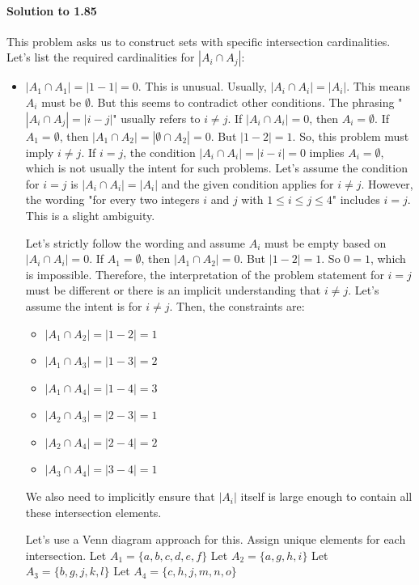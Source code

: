 \documentclass{article}
\begin{document}
\paragraph*{Solution to 1.85}
This problem asks us to construct sets with specific intersection cardinalities.
Let's list the required cardinalities for $|A_i \cap A_j|$:
\begin{itemize}
    \item $|A_1 \cap A_1| = |1-1| = 0$. This is unusual. Usually, $|A_i \cap A_i| = |A_i|$. This means $A_i$ must be $\emptyset$. But this seems to contradict other conditions.
    The phrasing "$|A_i \cap A_j| = |i-j|$" usually refers to $i \ne j$.
    If $|A_i \cap A_i| = 0$, then $A_i = \emptyset$. If $A_1 = \emptyset$, then $|A_1 \cap A_2| = |\emptyset \cap A_2| = 0$. But $|1-2| = 1$.
    So, this problem must imply $i \neq j$. If $i=j$, the condition $|A_i \cap A_i| = |i-i|=0$ implies $A_i = \emptyset$, which is not usually the intent for such problems. Let's assume the condition for $i=j$ is $|A_i \cap A_i| = |A_i|$ and the given condition applies for $i \ne j$. However, the wording "for every two integers $i$ and $j$ with $1 \le i \le j \le 4$" includes $i=j$. This is a slight ambiguity.

    Let's strictly follow the wording and assume $A_i$ must be empty based on $|A_i \cap A_i| = 0$.
    If $A_1 = \emptyset$, then $|A_1 \cap A_2| = 0$. But $|1-2|=1$. So $0=1$, which is impossible.
    Therefore, the interpretation of the problem statement for $i=j$ must be different or there is an implicit understanding that $i \ne j$.
    Let's assume the intent is for $i \ne j$. Then, the constraints are:
    \begin{itemize}
        \item $|A_1 \cap A_2| = |1-2| = 1$
        \item $|A_1 \cap A_3| = |1-3| = 2$
        \item $|A_1 \cap A_4| = |1-4| = 3$
        \item $|A_2 \cap A_3| = |2-3| = 1$
        \item $|A_2 \cap A_4| = |2-4| = 2$
        \item $|A_3 \cap A_4| = |3-4| = 1$
    \end{itemize}
    We also need to implicitly ensure that $|A_i|$ itself is large enough to contain all these intersection elements.

Let's use a Venn diagram approach for this. Assign unique elements for each intersection.
Let $A_1 = \{a, b, c, d, e, f\}$
Let $A_2 = \{a, g, h, i\}$
Let $A_3 = \{b, g, j, k, l\}$
Let $A_4 = \{c, h, j, m, n, o\}$


\end{itemize}
\end{document}
